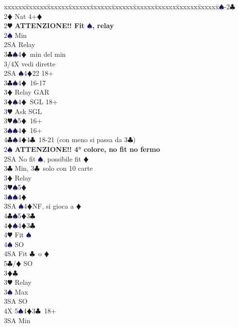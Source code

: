 \documentclass[a4paper,italian]{article}
\newcommand{\BC}{\textcolor{OliveGreen}{$\clubsuit$}}
\newcommand{\BD}{\textcolor{RedOrange}{$\vardiamondsuit$}}
\newcommand{\BH}{\textcolor{Red2}{$\varheartsuit${}}}
\newcommand{\BS}{\textcolor{MidnightBlue}{$\spadesuit${}}}
\newenvironment{bidtable}
{\begin{tabbing}

    xxxxxx\=xxxxxx\=xxxxxx\=xxxxxx\=xxxxxx\=xxxxxx\=xxxxxx\=xxxxxx\=xxxxxx\=xxxxxx\=\kill}
{\end{tabbing} }%
\begin{document}
\begin{multicols}{2}
    \begin{bidtable}
        1\BS-2\BC\\
        2\BD \> Nat 4+\BD \+\\
        2\BH \> \textbf{ATTENZIONE!! Fit \BS , relay}\+\\
        2\BS \> Min\+\\
        2SA \> Relay\+\\
        3\BC {}\BS 4\BD\ min del min\\
        3/4X \> vedi dirette\-\-\\
        2SA \BS 4\BD 22 18+\\
        3\BC {}\BS 4\BD\ 16-17\+\\
        3\BD \> Relay GAR\-\\
        3\BD {}\BS 4\BD\ SGL 18+\+\\
        3\BH \> Ask SGL\-\\
        3\BH {}\BS 5\BD\ 16+\\
        3\BS {}\BS 4\BD\ 16+\\
        4\BC {}\BS 4\BD 4\BC\ 18-21 (con meno si passa da 3\BC )\-\\
        2\BS \> \textbf{ATTENZIONE!! 4° colore, no fit no fermo}\\
        2SA \> No fit \BS , possibile fit \BD\+\\
        3\BC \> Min, 3\BC\ solo con 10 carte\+\\
        3\BD \> Relay\+\\
        3\BH {}\BS 5\BD \\
        3\BS {}\BS 4\BD \\
        3SA \BS 4\BD NF, si gioca a \BD \\
        4\BC {}\BS 5\BD 3\BC \\
        4\BD {}\BS 4\BD 3\BC \+\\
        4\BH \> Fit \BS\\
        4\BS \> SO \\
        4SA \> Fit \BC\ o \BD \\
        5\BC/\BD \> SO\-\-\-\\
        3\BD {}\BC \+\\
        3\BH \> Relay\+\\
        3\BS \> Max\+\\
        3SA \> SO\+\\
        4X 5\BS 4\BD 3\BC\ 18+\-\-\\
        3SA \> Min\\

\end{bidtable}
\end{multicols}
\end{document}
